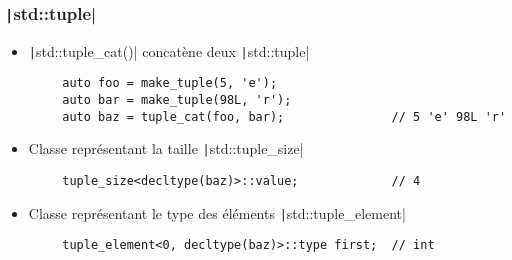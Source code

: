 \documentclass[C++.tex]{subfiles}
\begin{document}
\begin{frame}[fragile]
	\frametitle{\texttt|std::tuple|}
	\begin{itemize}
		\item \texttt|std::tuple_cat()| concatène deux \texttt|std::tuple|
	\end{itemize}

	\begin{verbatim}
		auto foo = make_tuple(5, 'e');
		auto bar = make_tuple(98L, 'r');
		auto baz = tuple_cat(foo, bar);               // 5 'e' 98L 'r'
	\end{verbatim}

	\begin{itemize}
		\item Classe représentant la taille \texttt|std::tuple_size|
	\end{itemize}

	\begin{verbatim}
		tuple_size<decltype(baz)>::value;             // 4
	\end{verbatim}

	\begin{itemize}
		\item Classe représentant le type des éléments \texttt|std::tuple_element|
	\end{itemize}

	\begin{verbatim}
		tuple_element<0, decltype(baz)>::type first;  // int
	\end{verbatim}


\end{frame}
\end{document}
